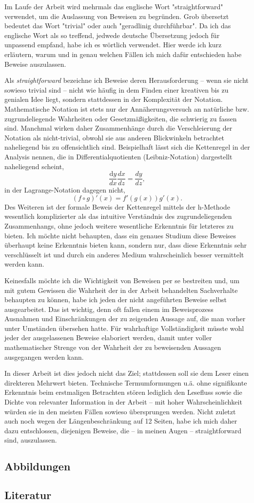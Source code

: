 \documentclass[a4paper,12pt,ngerman]{scrartcl}
\theoremstyle{plain}
\theoremstyle{plain}
\begin{document}
Im Laufe der Arbeit wird mehrmals das englische Wort "straightforward" verwendet, um die Auslassung von Beweisen zu begründen. Grob übersetzt bedeutet das Wort "trivial" oder auch "geradlinig durchführbar". Da ich das englische Wort als so treffend, jedwede deutsche Übersetzung jedoch für unpassend empfand, habe ich es wörtlich verwendet. Hier werde ich kurz erläutern, warum und in genau welchen Fällen ich mich dafür entschieden habe Beweise auszulassen.

Als \textit{straightforward} bezeichne ich Beweise deren Herausforderung -- wenn sie nicht sowieso trivial sind -- nicht wie häufig in dem Finden einer kreativen bis zu genialen Idee liegt, sondern stattdessen in der Komplexität der Notation. Mathematische Notation ist stets nur der Annäherungsversuch an natürliche bzw. zugrundeliegende Wahrheiten oder Gesetzmäßigkeiten, die schwierig zu fassen sind. Manchmal wirken daher Zusammenhänge durch die Verschleierung der Notation als nicht-trivial, obwohl sie aus anderen Blickwinkeln betrachtet naheliegend bis zu offensichtlich sind. Beispielhaft lässt sich die Kettenregel in der Analysis nennen, die in Differentialquotienten (Leibniz-Notation) dargestellt naheliegend scheint,
\[ \frac{\mathrm{d}y}{dx}\frac{dx}{dz} = \frac{dy}{dz},\]
in der Lagrange-Notation dagegen nicht,
\[ (f\circ g)'(x) = f'(g(x))g'(x). \]
Des Weiteren ist der formale Beweis der Kettenregel mittels der h-Methode wesentlich komplizierter als das intuitive Verständnis des zugrundeliegenden Zusammenhangs, ohne jedoch weitere wesentliche Erkenntnis für letzteres zu bieten. Ich möchte nicht behaupten, dass ein genaues Studium diese Beweises überhaupt keine Erkenntnis bieten kann, sondern nur, dass diese Erkenntnis sehr verschlüsselt ist und durch ein anderes Medium wahrscheinlich besser vermittelt werden kann.

Keinesfalls möchte ich die Wichtigkeit von Beweisen per se bestreiten und, um mit gutem Gewissen die Wahrheit der in der Arbeit behandelten Sachverhalte behaupten zu können, habe ich jeden der nicht angeführten Beweise selbst ausgearbeitet. Das ist wichtig, denn oft fallen einem im Beweisprozess Ausnahmen und Einschränkungen der zu zeigenden Aussage auf, die man vorher unter Umständen übersehen hatte. Für wahrhaftige Vollständigkeit müsste wohl jeder der ausgelassenen Beweise elaboriert werden, damit unter voller mathematischer Strenge von der Wahrheit der zu beweisenden Aussagen ausgegangen werden kann. 

In dieser Arbeit ist dies jedoch nicht das Ziel; stattdessen soll sie dem Leser einen direkteren Mehrwert bieten. Technische Termumformungen u.ä. ohne signifikante Erkenntnis beim erstmaligen Betrachten stören lediglich den Lesefluss sowie die Dichte von relevanter Information in der Arbeit -- mit hoher Wahrscheinlichkeit würden sie in den meisten Fällen sowieso übersprungen werden. Nicht zuletzt auch noch wegen der Längenbeschränkung auf 12 Seiten, habe ich mich daher dazu entschlossen, diejenigen Beweise, die -- in meinen Augen -- straightforward sind, auszulassen.

\subsection{Abbildungen}

\subsection{Literatur}
\end{document}

